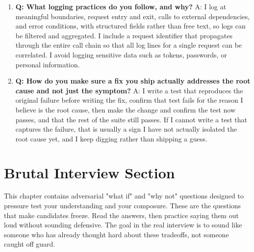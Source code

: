 \documentclass[11pt,a4paper]{report}
\begin{document}
\begin{enumerate}[leftmargin=*]
\item \textbf{Q: What logging practices do you follow, and why?}
A: I log at meaningful boundaries, request entry and exit, calls to external dependencies, and error conditions, with structured fields rather than free text, so logs can be filtered and aggregated. I include a request identifier that propagates through the entire call chain so that all log lines for a single request can be correlated. I avoid logging sensitive data such as tokens, passwords, or personal information.

\item \textbf{Q: How do you make sure a fix you ship actually addresses the root cause and not just the symptom?}
A: I write a test that reproduces the original failure before writing the fix, confirm that test fails for the reason I believe is the root cause, then make the change and confirm the test now passes, and that the rest of the suite still passes. If I cannot write a test that captures the failure, that is usually a sign I have not actually isolated the root cause yet, and I keep digging rather than shipping a guess.
\end{enumerate}

\chapter{Brutal Interview Section}

This chapter contains adversarial "what if" and "why not" questions designed to pressure test your understanding and your composure. These are the questions that make candidates freeze. Read the answers, then practice saying them out loud without sounding defensive. The goal in the real interview is to sound like someone who has already thought hard about these tradeoffs, not someone caught off guard.
\end{document}
